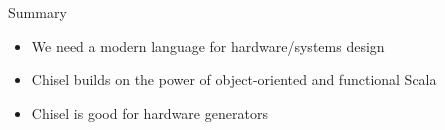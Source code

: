 \documentclass[xcolor=pdflatex,dvipsnames,table]{beamer}
\begin{document}
\begin{frame}[fragile]{Summary}
\begin{itemize}
\item We need a modern language for hardware/systems design
\item Chisel builds on the power of object-oriented and functional Scala
\item Chisel is good for hardware generators
\end{itemize}
\end{frame}
\end{document}
